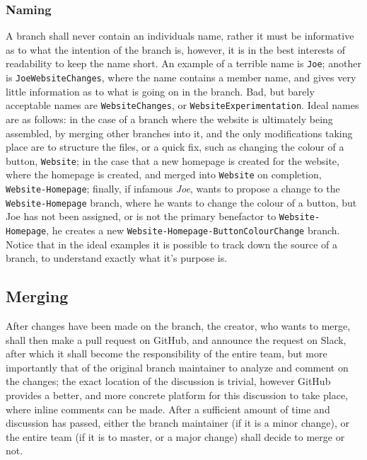 \documentclass[12pt]{article}
\begin{document}
  \subsubsection{Naming}
  A branch shall never contain an individuals name, rather it must be informative as to what the intention of the branch is, however, it is in the best interests of readability to keep the name short. An example of a terrible name is \texttt{Joe}; another is \texttt{JoeWebsiteChanges}, where the name contains a member name, and gives very little information as to what is going on in the branch. Bad, but barely acceptable names are \texttt{WebsiteChanges}, or \texttt{WebsiteExperimentation}. Ideal names are as follows: in the case of a branch where the website is ultimately being assembled, by merging other branches into it, and the only modifications taking place are to structure the files, or a quick fix, such as changing the colour of a button, \texttt{Website}; in the case that a new homepage is created for the website, where the homepage is created, and merged into \texttt{Website} on completion, \texttt{Website-Homepage}; finally, if infamous \textit{Joe}, wants to propose a change to the \texttt{Website-Homepage} branch, where he wants to change the colour of a button, but Joe has not been assigned, or is not the primary benefactor to \texttt{Website-Homepage}, he creates a new \texttt{Website-Homepage-ButtonColourChange} branch. Notice that in the ideal examples it is possible to track down the source of a branch, to understand exactly what it's purpose is.
  
  \subsection{Merging}
  After changes have been made on the branch, the creator, who wants to merge, shall then make a pull request on GitHub, and announce the request on Slack, after which it shall become the responsibility of the entire team, but more importantly that of the original branch maintainer to analyze and comment on the changes; the exact location of the discussion is trivial, however GitHub provides a better, and more concrete platform for this discussion to take place, where inline comments can be made. After a sufficient amount of time and discussion has passed, either the branch maintainer (if it is a minor change), or the entire team (if it is to master, or a major change) shall decide to merge or not.
  
\end{document}
